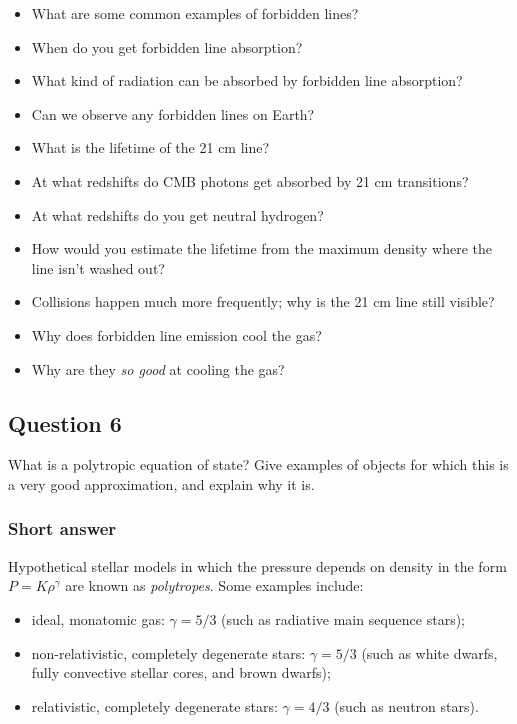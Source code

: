 \documentclass[a4paper,10pt]{article}
\begin{document}
\begin{itemize}
    \item What are some common examples of forbidden lines?
    \item When do you get forbidden line absorption?
    \item What kind of radiation can be absorbed by forbidden line absorption?
    \item Can we observe any forbidden lines on Earth?
    \item What is the lifetime of the 21 cm line?
    \item At what redshifts do CMB photons get absorbed by 21 cm transitions?
    \item At what redshifts do you get neutral hydrogen?
    \item How would you estimate the lifetime from the maximum density where the line isn't washed out?
    \item Collisions happen much more frequently; why is the 21 cm line still visible?
    \item Why does forbidden line emission cool the gas?
    \item Why are they \textit{so good} at cooling the gas?
\end{itemize}


\newpage
\subsection{Question 6}

What is a polytropic equation of state? Give examples of objects for which this is a very good approximation, and explain why it is.

\subsubsection{Short answer}

Hypothetical stellar models in which the pressure depends on density in the form $P=K\rho^\gamma$ are known as \textit{polytropes}. Some examples include:

\begin{itemize}
    \item ideal, monatomic gas: $\gamma=5/3$ (such as radiative main sequence stars);
    \item non-relativistic, completely degenerate stars: $\gamma=5/3$ (such as white dwarfs, fully convective stellar cores, and brown dwarfs);
    \item relativistic, completely degenerate stars: $\gamma=4/3$ (such as neutron stars).
\end{itemize}
\end{document}
